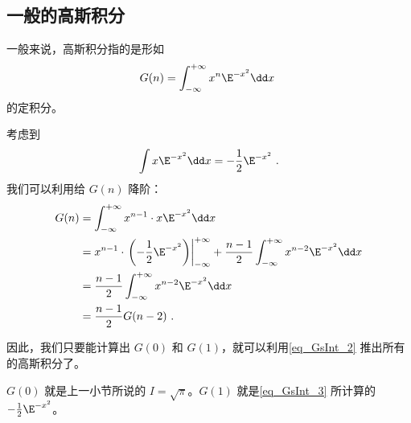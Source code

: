 \subsection{一般的高斯积分}

一般来说，高斯积分指的是形如
\begin{equation}
G(n)=\int_{-\infty}^{+\infty} x^n\E^{-x^2}\dd x~
\end{equation}
的定积分。

考虑到
\begin{equation}\label{eq_GsInt_3}
\int x\E^{-x^2}\dd x=-\frac{1}{2}\E^{-x^2}~.
\end{equation}
我们可以利用给 $G(n)$ 降阶：
\begin{equation}\label{eq_GsInt_2}
\begin{aligned}
G(n)&=\int_{-\infty}^{+\infty} x^{n-1}\cdot x\E^{-x^2}\dd x\\
&=x^{n-1}\cdot\left.\left(-\frac{1}{2}\E^{-x^2}\right)\right|_{-\infty}^{+\infty}+\frac{n-1}{2}\int_{-\infty}^{+\infty} x^{n-2}\E^{-x^2}\dd x\\
&=\frac{n-1}{2}\int_{-\infty}^{+\infty} x^{n-2}\E^{-x^2}\dd x\\
&=\frac{n-1}{2}G(n-2)~.
\end{aligned}
\end{equation}

因此，我们只要能计算出 $G(0)$ 和 $G(1)$，就可以利用\autoref{eq_GsInt_2} 推出所有的高斯积分了。

$G(0)$ 就是上一小节所说的 $I=\sqrt{\pi}$。$G(1)$ 就是\autoref{eq_GsInt_3} 所计算的 $-\frac{1}{2}\E^{-x^2}$。









